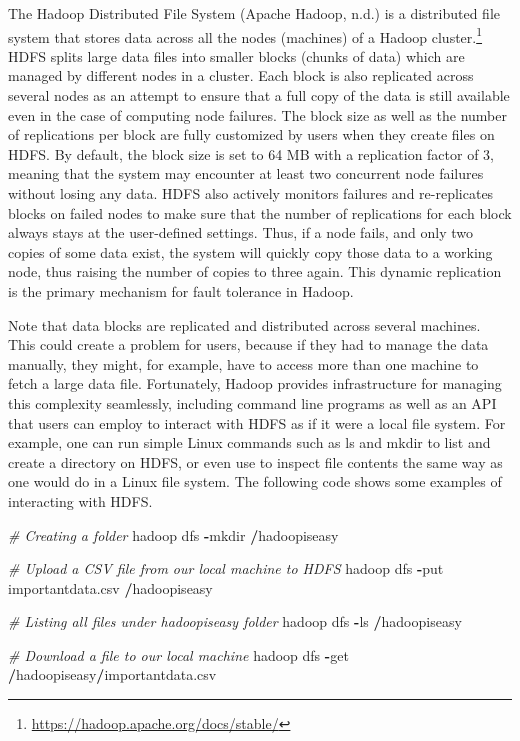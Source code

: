 \documentclass[]{krantz}
\newenvironment{Shaded}{\begin{snugshade}}{\end{snugshade}}
\newcommand{\CommentTok}[1]{\textcolor[rgb]{0.56,0.35,0.01}{\textit{#1}}}
\newcommand{\OperatorTok}[1]{\textcolor[rgb]{0.81,0.36,0.00}{\textbf{#1}}}
\newcommand{\NormalTok}[1]{#1}
\begin{document}
The Hadoop Distributed File System (Apache Hadoop, n.d.) is a
distributed file system that stores data across all the nodes (machines)
of a Hadoop cluster.\footnote{\url{https://hadoop.apache.org/docs/stable/}}
HDFS splits large data files into smaller blocks (chunks of data) which
are managed by different nodes in a cluster. Each block is also
replicated across several nodes as an attempt to ensure that a full copy
of the data is still available even in the case of computing node
failures. The block size as well as the number of replications per block
are fully customized by users when they create files on HDFS. By
default, the block size is set to 64 MB with a replication factor of 3,
meaning that the system may encounter at least two concurrent node
failures without losing any data. HDFS also actively monitors failures
and re-replicates blocks on failed nodes to make sure that the number of
replications for each block always stays at the user-defined settings.
Thus, if a node fails, and only two copies of some data exist, the
system will quickly copy those data to a working node, thus raising the
number of copies to three again. This dynamic replication is the primary
mechanism for fault tolerance in Hadoop.

Note that data blocks are replicated and distributed across several
machines. This could create a problem for users, because if they had to
manage the data manually, they might, for example, have to access more
than one machine to fetch a large data file. Fortunately, Hadoop
provides infrastructure for managing this complexity seamlessly,
including command line programs as well as an API that users can employ
to interact with HDFS as if it were a local file system. For example,
one can run simple Linux commands such as ls and mkdir to list and
create a directory on HDFS, or even use to inspect file contents the
same way as one would do in a Linux file system. The following code
shows some examples of interacting with HDFS.

\begin{Shaded}
\begin{Highlighting}[]
\CommentTok{# Creating a folder}
\NormalTok{hadoop dfs }\OperatorTok{-}\NormalTok{mkdir }\OperatorTok{/}\NormalTok{hadoopiseasy}

\CommentTok{# Upload a CSV file from our local machine to HDFS}
\NormalTok{hadoop dfs }\OperatorTok{-}\NormalTok{put importantdata.csv }\OperatorTok{/}\NormalTok{hadoopiseasy}

\CommentTok{# Listing all files under hadoopiseasy folder}
\NormalTok{hadoop dfs }\OperatorTok{-}\NormalTok{ls }\OperatorTok{/}\NormalTok{hadoopiseasy}

\CommentTok{# Download a file to our local machine}
\NormalTok{hadoop dfs }\OperatorTok{-}\NormalTok{get }\OperatorTok{/}\NormalTok{hadoopiseasy}\OperatorTok{/}\NormalTok{importantdata.csv}
\end{Highlighting}
\end{Shaded}
\end{document}
